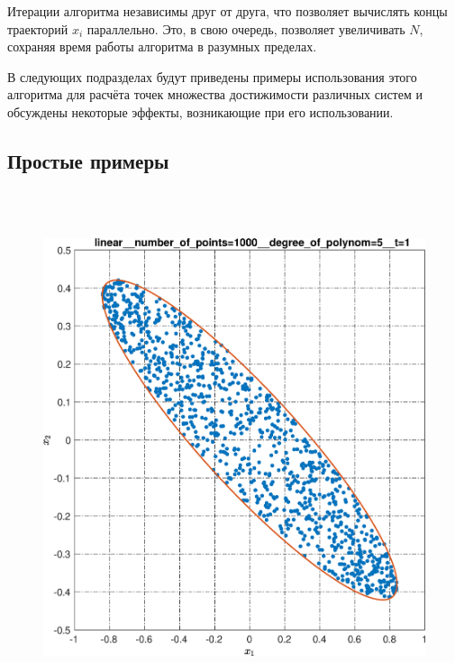 \documentclass[../main.tex]{subfiles}
\begin{document}
 Итерации алгоритма независимы друг от друга, что позволяет вычислять концы траекторий $x_i$ параллельно. 
 Это, в свою очередь, позволяет увеличивать $N$, сохраняя время работы алгоритма в разумных пределах.
 
 В следующих подразделах будут приведены примеры использования этого алгоритма для расчёта точек множества достижимости различных систем и обсуждены некоторые эффекты, возникающие при его использовании.
 
 \subsection{Простые примеры}
 \begin{figure}[ht!] 
 	\hspace{-2.5ex}
 	\begin{minipage}[b]{.3\linewidth} 
 		\small
 		\centering 
 		\includegraphics[width=\linewidth]{images/linear__number_of_points=1000__degree_of_polynom=5__t=1.eps}
 		\label{fig:ap:linearN103k5T1} 
 	\end{minipage}
 	\hfill
 	\begin{minipage}[b]{.3\linewidth} 
 		\small
 		\centering

\end{minipage}
\end{figure}
\end{document}
